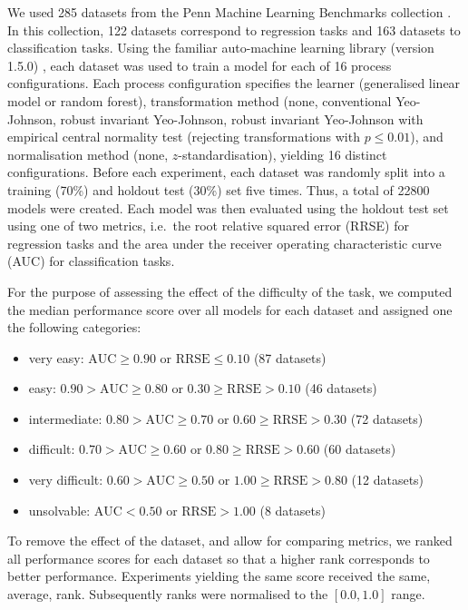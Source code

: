 \documentclass[preprint,12pt,authoryear]{elsarticle}
\begin{document}
We used 285 datasets from the Penn Machine Learning Benchmarks
collection \citep{Romano2022-gq}. In this collection, 122 datasets
correspond to regression tasks and 163 datasets to classification tasks.
Using the familiar auto-machine learning library (version 1.5.0) \citep{Zwanenburg2021-so},
each dataset was used to train a model for each
of 16 process configurations. Each process configuration specifies the
learner (generalised linear model or random forest), transformation
method (none, conventional Yeo-Johnson, robust invariant Yeo-Johnson,
robust invariant Yeo-Johnson with empirical central normality test
(rejecting transformations with \(p \leq 0.01\)), and normalisation
method (none, \(z\)-standardisation), yielding 16 distinct
configurations. Before each experiment, each dataset was randomly split
into a training (70\%) and holdout test (30\%) set five times. Thus, a
total of 22800 models were created. Each model was then evaluated using
the holdout test set using one of two metrics, i.e.~the root relative
squared error (RRSE) for regression tasks and the area under the
receiver operating characteristic curve (AUC) for classification tasks.

For the purpose of assessing the effect of the difficulty of the task,
we computed the median performance score over all models for each
dataset and assigned one the following categories:

\begin{itemize}
\item
  very easy: \(\text{AUC} \geq 0.90\) or \(\text{RRSE} \leq 0.10\) (87
  datasets)
\item
  easy: \(0.90 > \text{AUC} \geq 0.80\) or
  \(0.30 \geq \text{RRSE} > 0.10\) (46 datasets)
\item
  intermediate: \(0.80 > \text{AUC} \geq 0.70\) or
  \(0.60 \geq \text{RRSE} > 0.30\) (72 datasets)
\item
  difficult: \(0.70 > \text{AUC} \geq 0.60\) or
  \(0.80 \geq \text{RRSE} > 0.60\) (60 datasets)
\item
  very difficult: \(0.60 > \text{AUC} \geq 0.50\) or
  \(1.00 \geq \text{RRSE} > 0.80\) (12 datasets)
\item
  unsolvable: \(\text{AUC} < 0.50\) or \(\text{RRSE} > 1.00\) (8
  datasets)
\end{itemize}

To remove the effect of the dataset, and allow for comparing metrics, we
ranked all performance scores for each dataset so that a higher rank
corresponds to better performance. Experiments yielding the same score
received the same, average, rank. Subsequently ranks were normalised to
the \([0.0, 1.0]\) range.
\end{document}
